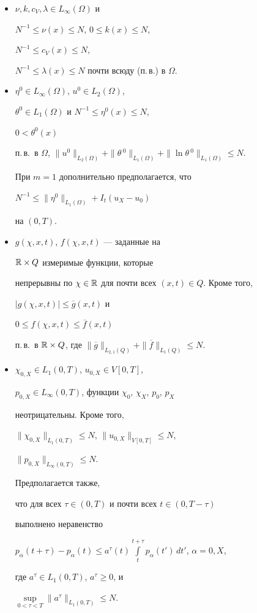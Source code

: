\begin{itemize}


\item[С${}_1$)] $\nu, k, c_V, \lambda\in L_\infty(\Omega)$ и


$N^{-1}\le\nu(x)\le N$, $0\le k(x)\le N$,


$N^{-1}\le c_V(x)\le N$,


$N^{-1}\le\lambda(x)\le N$  почти всюду (п.\,в.) в $\Omega$.


\item[С${}_2$)] $\eta^0\in L_\infty(\Omega)$, $u^0\in L_2(\Omega)$,


$\theta^0\in L_1(\Omega)$ и $N^{-1}\le\eta^0(x)\le N$,


$0<\theta^0(x)$


п.\,в.~в $\Omega$, $\|u^0\|_{L_2(\Omega)}+\|\theta\,^0\|_{L_1(\Omega)}+


\|\ln \theta\,^0\|_{L_1(\Omega)}\le N$.


При $m=1$ дополнительно предполагается, что


$N^{-1}\le\|\eta^0\|_{L_1(\Omega)}+I_t(u_X-u_0)$


на $(0,T)$.


\item[С${}_3$)] $g(\chi,x,t)$, $f(\chi,x,t)$ --- заданные на


$\Bbb R\times Q$ измеримые функции, которые


непрерывны по $\chi\in \Bbb R$ для почти всех $(x,t)\in Q$. Кроме того,


$|g(\chi,x,t)|\le \overline g(x,t)$ и


$0\le f(\chi,x,t)\le \overline f(x,t)$


п.\,в.~в $\Bbb R\times Q$, где $\|\overline g\|_{L_{2,1}(Q)}+


\|\overline f\|_{L_1(Q)}\le N.$


\item[С${}_4$)] $\chi_{0,X}\in L_1(0,T)$, $u_{0,X}\in V[0,T]$,


$p_{0,X}\in L_{\infty}(0,T)$, функции $\chi_0$, $\chi_X$, $p_0$, $p_X$


неотрицательны. Кроме того,


$\|\chi_{0,X}\|_{L_1(0,T)}\le N$, $\|u_{0,X}\|_{V[0,T]}\le N$,


$\|p_{0,X}\|_{L_\infty (0,T)}\le N$.


Предполагается также,


что для всех $\tau\in (0,T)$ и почти всех $t\in (0,T-\tau)$


выполнено неравенство


$


p_{\alpha}(t+\tau)-p_{\alpha}(t)\le


a^\tau (t)\int\limits_{t}^{t+\tau}p_{\alpha}(t')\,dt'$, $\alpha=0,X$,


где $a^\tau\in L_1(0,T)$, $a^\tau\ge 0$, и


$\underset{0<\tau<T}{\sup}{} \|a^\tau\|_{L_1(0,T)}\le N$.


\end{itemize}





